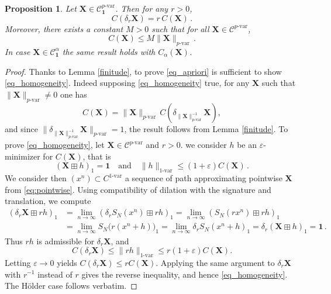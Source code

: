 \documentclass[12pt,a4paper]{article}
\numberwithin{equation}{section}
\theoremstyle{plain}
\newtheorem{proposition}[theorem]{Proposition}
\theoremstyle{definition}
\theoremstyle{remark}
\begin{document}
\begin{proposition}\label{prop_apriori}
Let \( \mathbf{X} \in \mathcal{C}^{p\text{-var}}_{\mathbf{1}}\). Then for any \( r>0 \),
\begin{equation}\label{eq_homogeneity}
C(\delta_r \mathbf{X}) = r\, C(\mathbf{X})\,.
\end{equation}
Moreover, there exists a constant \( M>0 \) such that for all \( \mathbf{X} \in \mathcal{C}^{p\text{-var}} \),
\begin{equation}\label{eq_apriori}
C(\mathbf{X}) \le M \|\mathbf{X}\|_{p\text{-var}}\,.
\end{equation}
In case $\mathbf{X} \in \mathcal{C}^{\alpha}_{\mathbf{1}}$ the same result holds with $C_{\alpha}(\mathbf{X})$.
\end{proposition}

\begin{proof}
Thanks to Lemma \ref{finitude}, to prove \eqref{eq_apriori} is sufficient to show \eqref{eq_homogeneity}. Indeed supposing \eqref{eq_homogeneity} true, for any \( \mathbf{X}  \) such that $\|\mathbf{X}\|_{p\text{-var}} \neq 0$ one has
\[
C(\mathbf{X})
= \|\mathbf{X}\|_{p\text{-var}} \,
C\!\left(\delta_{\|\mathbf{X}\|_{p\text{-var}}^{-1}} \mathbf{X}\right),
\]
and since \( \|\delta_{\|\mathbf{X}\|_{p\text{-var}}^{-1}} \mathbf{X}\|_{p\text{-var}} = 1 \), the result follows from Lemma \ref{finitude}. To prove \eqref{eq_homogeneity}, let \( \mathbf{X} \in \mathcal{C}^{p\text{-var}}\) and $r>0$. we consider  \( h \) be an \(\varepsilon\)-minimizer for \(C(\mathbf{X})\), that is
\[
(\mathbf{X} \boxplus h)_1 = \mathbf{1}
\quad \text{and} \quad
\|h\|_{1\text{-var}} \le (1+\varepsilon) C(\mathbf{X})\,.
\]
We consider then $(x^n)\subset C^{1\text{-var}}$ a sequence of path approximating pointwise $\mathbf{X}$ from \eqref{eq:pointwise}. Using compatibility of dilation with the signature and translation, we compute
\begin{align*}
(\delta_r \mathbf{X} \boxplus r h)_1
&= \lim_{n\to\infty} (\delta_r S_N(x^n) \boxplus r h)_1= \lim_{n\to\infty} (S_N(rx^n) \boxplus r h)_1 \\
&= \lim_{n\to\infty} S_N\bigl(r(x^n + h)\bigr)_1 = \lim_{n\to\infty} \delta_r S_N(x^n + h)_1 = \delta_r (\mathbf{X} \boxplus h)_1= \mathbf{1}\,.
\end{align*}
Thus \( r h \) is admissible for \( \delta_r \mathbf{X} \), and
\[
C(\delta_r \mathbf{X}) \le \|r h\|_{1\text{-var}} \le r(1+\varepsilon) C(\mathbf{X}).
\]
Letting \(\varepsilon \to 0\) yields \( C(\delta_r \mathbf{X}) \le r C(\mathbf{X}) \). Applying the same argument to $\delta_r \mathbf{X}$ with \(r^{-1}\) instead of \(r\) gives the reverse inequality, and hence \eqref{eq_homogeneity}. The H\"older case follows verbatim.
\end{proof}
\end{document}
